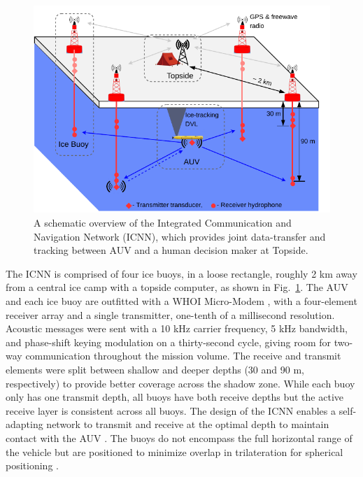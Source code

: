 \begin{figure}[h!]
	\centering
	\includegraphics[width=\reprintcolumnwidth]{figs/Fig2.pdf}
	\caption{A schematic overview of the Integrated Communication and Navigation Network (ICNN), which provides joint data-transfer and tracking between AUV and a human decision maker at Topside.}
	\label{fig:icnnOverview}
\end{figure}

The ICNN is comprised of four ice buoys, in a loose rectangle, roughly 2 km away from a central ice camp with a topside computer, as shown in Fig.~\ref{fig:icnnOverview}.
The AUV and each ice buoy are outfitted with a WHOI Micro-Modem \citep{singh_underwater_2006}, with a four-element receiver array and a single transmitter, one-tenth of a millisecond resolution.
Acoustic messages were sent with a 10 kHz carrier frequency, 5 kHz bandwidth, and phase-shift keying modulation on a thirty-second cycle, giving room for two-way communication throughout the mission volume.
The receive and transmit elements were split between shallow and deeper depths (30 and 90 m, respectively) to provide better coverage across the shadow zone.
While each buoy only has one transmit depth, all buoys have both receive depths but the active receive layer is consistent across all buoys. 
The design of the ICNN enables a self-adapting network to transmit and receive at the optimal depth to maintain contact with the AUV \citep{schneider_self-adapting_2020}.
The buoys do not encompass the full horizontal range of the vehicle but are positioned to minimize overlap in trilateration for spherical positioning \citep{deffenbaugh_relationship_1996}.

